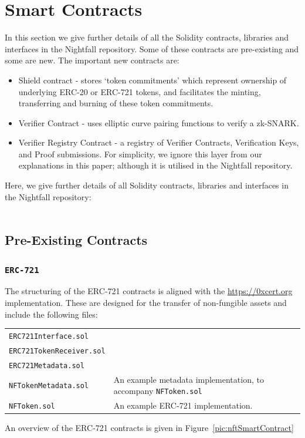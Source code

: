 \section{Smart Contracts}
\label{sec:smartContracts}
\secttoc

In this section we give further details of all the Solidity contracts, libraries and interfaces in the Nightfall repository.
Some of these contracts are pre-existing and some are new.
The important new contracts are:
\begin{itemize}
  \item Shield contract - stores `token commitments' which represent ownership of underlying ERC-20 or ERC-721 tokens, and facilitates the minting, transferring and burning of these token commitments.
  \item Verifier Contract - uses elliptic curve pairing functions to verify a zk-SNARK.
  \item Verifier Registry Contract - a registry of Verifier Contracts, Verification Keys, and Proof submissions. For simplicity, we ignore this layer from our explanations in this paper; although it is utilised in the Nightfall repository.
\end{itemize}

Here, we give further details of all Solidity contracts, libraries and interfaces in the Nightfall repository:\\
\\
\subsection{Pre-Existing Contracts}

\subsubsection{\texttt{ERC-721}}
The structuring of the ERC-721 contracts is aligned with the \url{https://0xcert.org} implementation.
These are designed for the transfer of non-fungible assets and include the following files:
\begin{center}
	\begin{tabular}{ll}
		\texttt{ERC721Interface.sol} & \\
		\texttt{ERC721TokenReceiver.sol} & \\
		\texttt{ERC721Metadata.sol} & \\
		\texttt{NFTokenMetadata.sol} & An example metadata implementation, to accompany \texttt{NFToken.sol} \\
		\texttt{NFToken.sol} & An example ERC-721 implementation.
	\end{tabular}
\end{center}
An overview of the ERC-721 contracts is given in Figure~\ref{pic:nftSmartContract}

